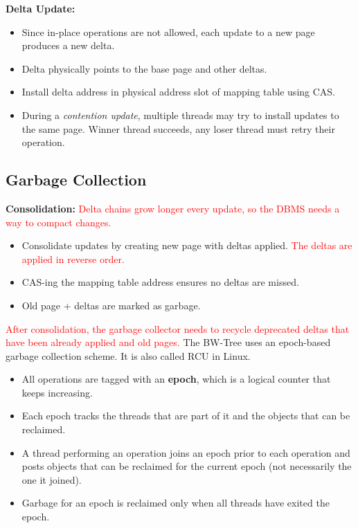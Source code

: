 \documentclass[11pt]{article}
\newcommand{\rr}[1]{\textcolor{red}{#1}}
\begin{document}
\textbf{Delta Update:}
\begin{itemize}
    \item
    Since in-place operations are not allowed, each update to a new page produces a new delta.
    
    \item
    Delta physically points to the base page and other deltas.
    
    \item
    Install delta address in physical address slot of mapping table using CAS.
    
    \item
    During a \textit{contention update}, multiple threads may try to install updates to the same page.
    Winner thread succeeds, any loser thread must retry their operation.
\end{itemize}

\subsection*{Garbage Collection}
\textbf{Consolidation: }\rr{Delta chains grow longer every update, so the DBMS needs a way to compact changes.}
\begin{itemize}
    \item Consolidate updates by creating new page with deltas applied. \rr{The deltas are applied in reverse order.}
    \item CAS-ing the mapping table address ensures no deltas are missed.
    \item Old page + deltas are marked as garbage.
\end{itemize}

\rr{After consolidation, the garbage collector needs to recycle deprecated deltas that have been already applied and old pages.} The BW-Tree uses an epoch-based garbage collection scheme. It is also called RCU in Linux.

\begin{itemize}
    \item
    All operations are tagged with an \textbf{epoch}, which is a logical counter that keeps increasing.
    
    \item
    Each epoch tracks the threads that are part of it and the objects that can be reclaimed.
    
    \item
    A thread performing an operation joins an epoch prior to each operation and posts objects that can be reclaimed for 
    the current epoch (not necessarily the one it joined).
    
    \item
    Garbage for an epoch is reclaimed only when all threads have exited the epoch.
\end{itemize}
\end{document}
